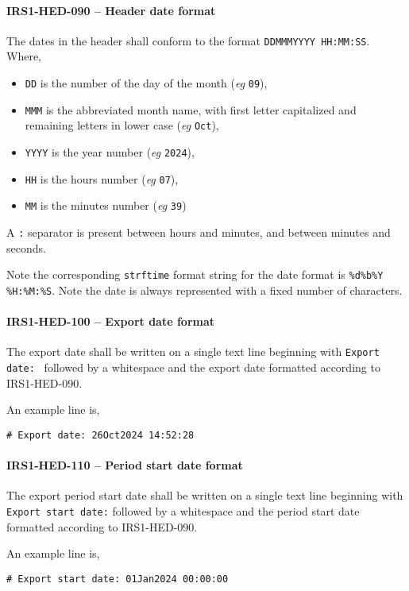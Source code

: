 \paragraph{IRS1-HED-090 -- Header date format}
The dates in the header shall conform to the format
\lstinline{DDMMMYYYY HH:MM:SS}.
Where,
\begin{itemize}
\item \lstinline{DD} is the number of the day of the month
  (\textit{eg} \lstinline{09}),
\item \lstinline{MMM} is the abbreviated month name, with first letter
  capitalized and remaining letters in lower case (\textit{eg} \lstinline{Oct}),
\item \lstinline{YYYY} is the year number (\textit{eg} \lstinline{2024}),
\item \lstinline{HH} is the hours number (\textit{eg} \lstinline{07}),
\item \lstinline{MM} is the minutes number (\textit{eg} \lstinline{39})
\end{itemize}

A \lstinline{:} separator is present between hours and minutes, and between
minutes and seconds.

Note the corresponding \lstinline{strftime} \cite{cpp:strftime} format string
for the date format is \lstinline{%d%b%Y %H:%M:%S}. Note the date is always
represented with a fixed number of characters.

\paragraph{IRS1-HED-100 -- Export date format}
The export date shall be written on a single text line beginning with
\lstinline{Export date: } followed by a whitespace and the export date
formatted according to IRS1-HED-090.

An example line is,
\begin{lstlisting}[numbers=none]
  # Export date: 26Oct2024 14:52:28
\end{lstlisting}

\paragraph{IRS1-HED-110 -- Period start date format}
The export period start date shall be written on a single text line beginning
with \lstinline{Export start date:} followed by a whitespace and the period
start date formatted according to IRS1-HED-090.

An example line is,
\begin{lstlisting}[numbers=none]
  # Export start date: 01Jan2024 00:00:00
\end{lstlisting}

